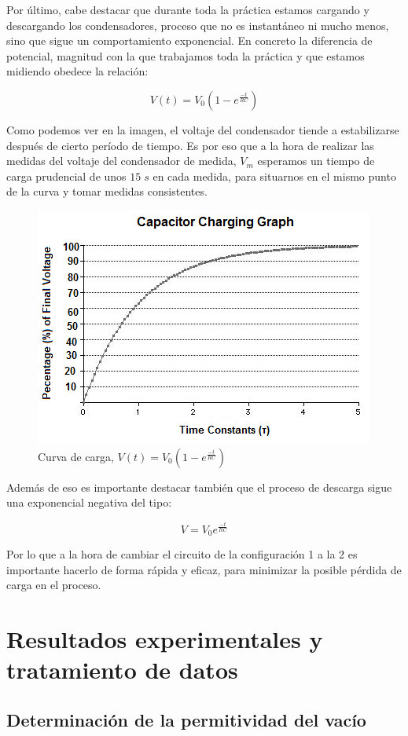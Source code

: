 \documentclass[a4paper,12pt,titlepage]{article}
\begin{document}
Por último, cabe destacar que durante toda la práctica estamos cargando y descargando los condensadores, proceso que no es instantáneo ni mucho menos, sino que sigue un comportamiento exponencial. En concreto la diferencia de potencial, magnitud con la que trabajamos toda la práctica y que estamos midiendo obedece la relación:

\begin{equation}
    V(t) = V_0(1-e^{\frac{-t}{RC}})
\end{equation}

Como podemos ver en la imagen, el voltaje del condensador tiende a estabilizarse después de cierto período de tiempo. Es por eso que a la hora de realizar las medidas del voltaje del condensador de medida, $V_m$ esperamos un tiempo de carga prudencial de unos $15\;s$ en cada medida, para situarnos en el mismo punto de la curva y tomar medidas consistentes.


\begin{figure}[h!]
    \centering
    \includegraphics[width=0.45\linewidth]{curva_carga.png}
    \caption{Curva de carga, $V(t) = V_0(1-e^{\frac{-t}{RC}})$}
    \label{fig:enter-label}
\end{figure}

\newpage

Además de eso es importante destacar también que el proceso de descarga sigue una exponencial negativa del tipo:

\begin{equation}
    V=V_0 e^{\frac{-t}{RC}}
\end{equation}

Por lo que a la hora de cambiar el circuito de la configuración 1 a la 2 es importante hacerlo de forma rápida y eficaz, para minimizar la posible pérdida de carga en el proceso.

\section{Resultados experimentales y tratamiento de datos}

\subsection{Determinación de la permitividad del vacío}
\end{document}

